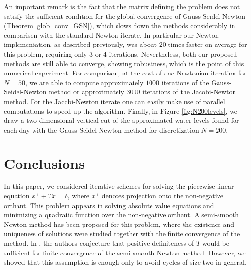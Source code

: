 \documentclass[11pt]{article}
\begin{document}
An important remark is the fact that the matrix defining the problem does not satisfy the sufficient condition for the global convergence of Gauss-Seidel-Newton (Theorem \ref{glob_conv_GSN}), which slows down the methods considerably in comparison with the standard Newton iterate. In particular our Newton implementation, as described previously, was about $20$ times faster on average for this problem, requiring only $3$ or $4$ iterations. Nevertheless, both our proposed methods are still able to converge, showing robustness, which is the point of this numerical experiment. For comparison, at the cost of one Newtonian iteration for $N=50$, we are able to compute approximately $1000$ iterations of the Gauss-Seidel-Newton method or approximately $3000$ iterations of the Jacobi-Newton method. For the Jacobi-Newton iterate one can easily make use of parallel computations to speed up the algorithm. Finally, in Figure \ref{fig:N200levels}, we draw a two-dimensional vertical cut of the approximated water levels found for each day with the Gauss-Seidel-Newton method for discretization $N=200$.









\section{Conclusions} \label{sec:conclusions}

In this paper, we considered iterative schemes for solving the piecewise linear equation $x^++Tx=b$, where $x^+$ denotes projection onto the non-negative orthant. This problem appears in solving absolute value equations and minimizing a quadratic function over the non-negative orthant. A semi-smooth Newton method has been proposed for this problem, where the existence and uniqueness of solutions were studied together with the finite convergence of the method. In \cite{Bello-Cruz:2017}, the authors conjecture that positive definiteness of $T$ would be sufficient for finite convergence of the semi-smooth Newton method. However, we showed that this assumption is enough only to avoid cycles of size two in general. 
\end{document}
